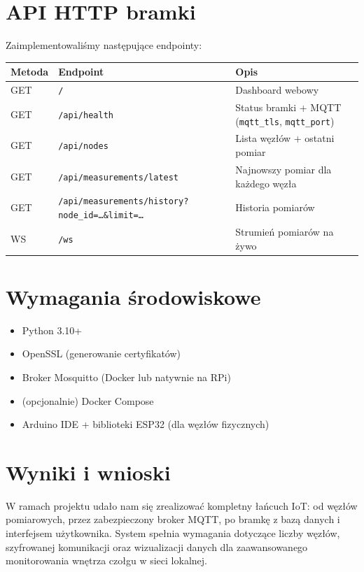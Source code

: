 \documentclass[12pt, a4paper]{article}
\begin{document}
\section{API HTTP bramki}
Zaimplementowaliśmy następujące endpointy:

\begin{table}[htbp]
    \centering
    \renewcommand{\arraystretch}{1.3}
    \begin{tabularx}{\textwidth}{@{} l l X @{}}
        \toprule
        \textbf{Metoda} & \textbf{Endpoint} & \textbf{Opis} \\
        \midrule
        GET & \texttt{/} & Dashboard webowy \\
        GET & \texttt{/api/health} & Status bramki + MQTT (\texttt{mqtt\_tls}, \texttt{mqtt\_port}) \\
        GET & \texttt{/api/nodes} & Lista węzłów + ostatni pomiar \\
        GET & \texttt{/api/measurements/latest} & Najnowszy pomiar dla każdego węzła \\
        GET & \texttt{/api/measurements/history?node\_id=…\&limit=…} & Historia pomiarów \\
        WS & \texttt{/ws} & Strumień pomiarów na żywo \\
        \bottomrule
    \end{tabularx}
\end{table}

\section{Wymagania środowiskowe}
\begin{itemize}
    \item Python 3.10+
    \item OpenSSL (generowanie certyfikatów)
    \item Broker Mosquitto (Docker lub natywnie na RPi)
    \item (opcjonalnie) Docker Compose
    \item Arduino IDE + biblioteki ESP32 (dla węzłów fizycznych)
\end{itemize}

\section{Wyniki i wnioski}
W ramach projektu udało nam się zrealizować kompletny łańcuch IoT: od węzłów pomiarowych, przez zabezpieczony broker MQTT, po bramkę z bazą danych i interfejsem użytkownika. System spełnia wymagania dotyczące liczby węzłów, szyfrowanej komunikacji oraz wizualizacji danych dla zaawansowanego monitorowania wnętrza czołgu w sieci lokalnej.
\end{document}

